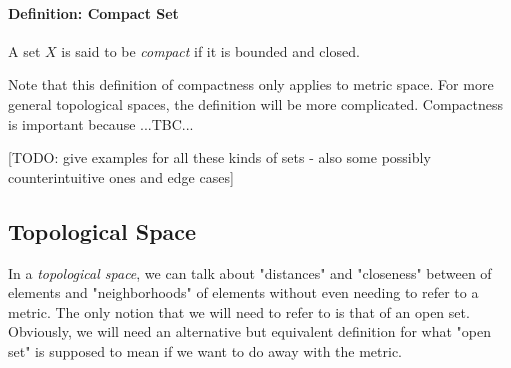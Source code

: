 \paragraph{Definition: Compact Set} A set $X$ is said to be \emph{compact} if it is bounded and closed.

\medskip
Note that this definition of compactness only applies to metric space. For more general topological spaces, the definition will be more complicated. Compactness is important because ...TBC...

[TODO: give examples for all these kinds of sets - also some possibly counterintuitive ones and edge cases]












\subsection{Topological Space}
In a \emph{topological space}, we can talk about "distances" and "closeness" between of elements and "neighborhoods" of elements without even needing to refer to a metric. The only notion that we will need to refer to is that of an open set. Obviously, we will need an alternative but equivalent definition for what "open set" is supposed to mean if we want to do away with the metric.



